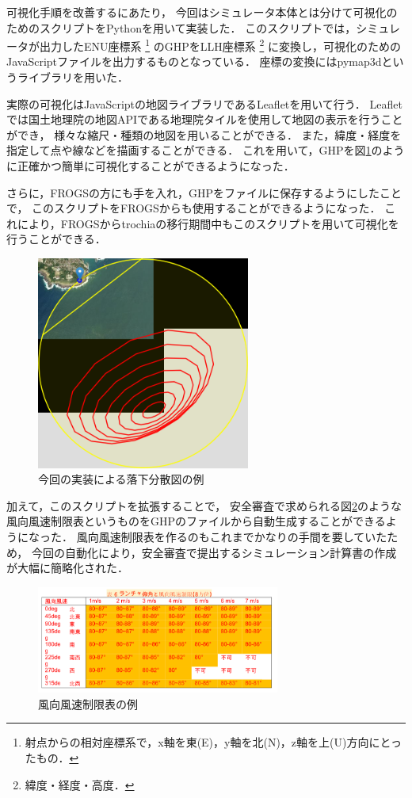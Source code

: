 \documentclass[a4j,10pt]{jsarticle}
\begin{document}
可視化手順を改善するにあたり，
今回はシミュレータ本体とは分けて可視化のためのスクリプトをPythonを用いて実装した．
このスクリプトでは，シミュレータが出力したENU座標系
\footnote{射点からの相対座標系で，x軸を東(E)，y軸を北(N)，z軸を上(U)方向にとったもの．}
のGHPをLLH座標系
\footnote{緯度・経度・高度．}
に変換し，可視化のためのJavaScriptファイルを出力するものとなっている．
座標の変換にはpymap3dというライブラリを用いた．

実際の可視化はJavaScriptの地図ライブラリであるLeafletを用いて行う．
Leafletでは国土地理院の地図APIである地理院タイルを使用して地図の表示を行うことができ，
様々な縮尺・種類の地図を用いることができる．
また，緯度・経度を指定して点や線などを描画することができる．
これを用いて，GHPを図\ref{ghp-new}のように正確かつ簡単に可視化することができるようになった．

さらに，FROGSの方にも手を入れ，GHPをファイルに保存するようにしたことで，
このスクリプトをFROGSからも使用することができるようになった．
これにより，FROGSからtrochiaの移行期間中もこのスクリプトを用いて可視化を行うことができる．

\begin{figure}[htbp]
	\begin{center}
		\includegraphics[width=7cm]{./ghp-new.png}
		\caption{今回の実装による落下分散図の例}
		\label{ghp-new}
	\end{center}
\end{figure}

加えて，このスクリプトを拡張することで，
安全審査で求められる図\ref{restrict-table-example}のような風向風速制限表というものをGHPのファイルから自動生成することができるようになった．
風向風速制限表を作るのもこれまでかなりの手間を要していたため，
今回の自動化により，安全審査で提出するシミュレーション計算書の作成が大幅に簡略化された．

\begin{figure}[htbp]
	\begin{center}
		\includegraphics[width=8cm]{./restrict-table-example.png}
		\caption{風向風速制限表の例}
		\label{restrict-table-example}
	\end{center}
\end{figure}
\end{document}
